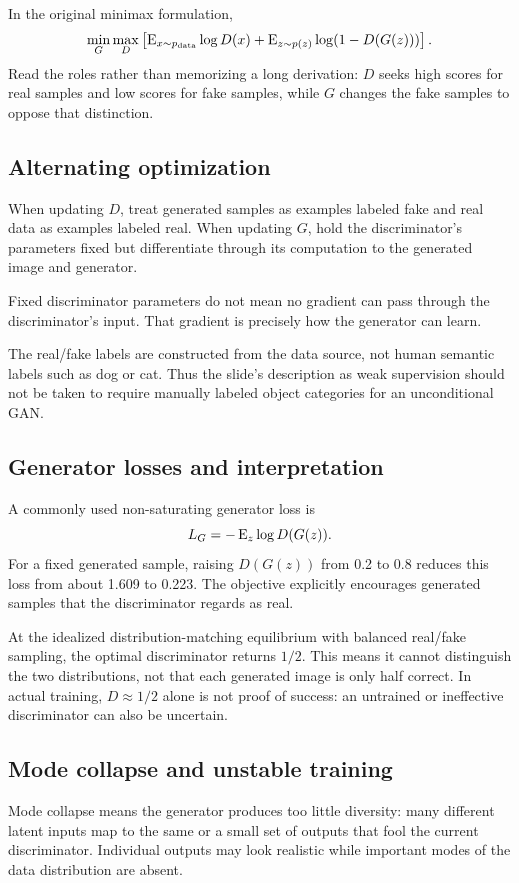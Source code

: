 \documentclass[11pt]{article}
\begin{document}
In the original minimax formulation,
\[
\min_G\max_D\left[
\operatorname{E}_{x\sim p_{\mathrm{data}}}\log D(x)
+\operatorname{E}_{z\sim p(z)}\log(1-D(G(z)))
\right].
\]
Read the roles rather than memorizing a long derivation: $D$ seeks high scores for real samples and low scores for fake samples, while $G$ changes the fake samples to oppose that distinction.

\subsection{Alternating optimization}
When updating $D$, treat generated samples as examples labeled fake and real data as examples labeled real. When updating $G$, hold the discriminator's parameters fixed but differentiate through its computation to the generated image and generator.

Fixed discriminator parameters do not mean no gradient can pass through the discriminator's input. That gradient is precisely how the generator can learn.

The real/fake labels are constructed from the data source, not human semantic labels such as dog or cat. Thus the slide's description as weak supervision should not be taken to require manually labeled object categories for an unconditional GAN.

\subsection{Generator losses and interpretation}
A commonly used non-saturating generator loss is
\[
L_G=-\operatorname{E}_z\log D(G(z)).
\]
For a fixed generated sample, raising $D(G(z))$ from 0.2 to 0.8 reduces this loss from about 1.609 to 0.223. The objective explicitly encourages generated samples that the discriminator regards as real.

At the idealized distribution-matching equilibrium with balanced real/fake sampling, the optimal discriminator returns $1/2$. This means it cannot distinguish the two distributions, not that each generated image is only half correct. In actual training, $D\approx1/2$ alone is not proof of success: an untrained or ineffective discriminator can also be uncertain.

\subsection{Mode collapse and unstable training}
Mode collapse means the generator produces too little diversity: many different latent inputs map to the same or a small set of outputs that fool the current discriminator. Individual outputs may look realistic while important modes of the data distribution are absent.
\end{document}
